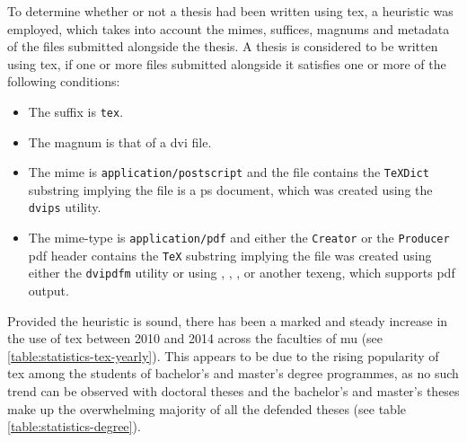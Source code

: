   To determine whether or not a thesis had been written using \gls{tex}, a heuristic was employed, which takes into account the \glspl{mime}, suffices, \glspl{magnum} and metadata of the files submitted alongside the thesis. A thesis is considered to be written using \gls{tex}, if one or more files submitted alongside it satisfies one or more of the following conditions:

  \begin{itemize}
    \item The suffix is \texttt{tex}.
    \item The \gls{magnum} is that of a \acrshort{dvi} file.
    \item The \gls{mime} is \texttt{application/postscript} and the file contains the \texttt{TeXDict} substring implying the file is a \gls{ps} document, which was created using the \texttt{dvips} utility.
    \item The mime-type is \texttt{application/pdf} and either the \texttt{Creator} or the \texttt{Producer} \gls{pdf} header contains the \texttt{TeX} substring implying the file was created using either the \texttt{dvipdfm} utility or using , , ,  or another \gls{texeng}, which supports \gls{pdf} output.
  \end{itemize}

  Provided the heuristic is sound, there has been a marked and steady increase in the use of \gls{tex} between 2010 and 2014 across the faculties of \gls{mu} (see \ref{table:statistics-tex-yearly}). This appears to be due to the rising popularity of \gls{tex} among the students of bachelor's and master's degree programmes, as no such trend can be observed with doctoral theses and the bachelor's and master's theses make up the overwhelming majority of all the defended theses (see table \ref{table:statistics-degree}).

